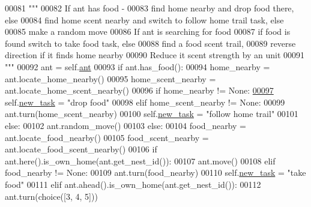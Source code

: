 \begin{DoxyCode}
00081         \textcolor{stringliteral}{"""}
00082 \textcolor{stringliteral}{         If ant has food - }
00083 \textcolor{stringliteral}{             find home nearby and drop food there, else}
00084 \textcolor{stringliteral}{             find home scent nearby and switch to follow home trail task, else}
00085 \textcolor{stringliteral}{             make a random move}
00086 \textcolor{stringliteral}{         If ant is searching for food}
00087 \textcolor{stringliteral}{             if food is found switch to take food task, else}
00088 \textcolor{stringliteral}{             find a food scent trail,}
00089 \textcolor{stringliteral}{             reverse direction if it finds home nearby}
00090 \textcolor{stringliteral}{         Reduce it scent strength by an unit}
00091 \textcolor{stringliteral}{        """}
00092         ant = self.\hyperlink{classtask__manager_1_1Task_ac43e25887825a1bb6e3d4a5a049968be}{ant}
00093         \textcolor{keywordflow}{if} ant.has\_food():
00094             home\_nearby = ant.locate\_home\_nearby()
00095             home\_scent\_nearby = ant.locate\_home\_scent\_nearby()
00096             \textcolor{keywordflow}{if} home\_nearby != \textcolor{keywordtype}{None}:
\hypertarget{task__manager_8py_source_l00097}{}\hyperlink{classtask__manager_1_1Explore_ab1f83ac00c442f8eedd1403a59e74060}{00097}                 self.\hyperlink{classtask__manager_1_1Task_af16658f4c3c447e24f73ed3d1803e058}{new\_task} = \textcolor{stringliteral}{"drop food"}
00098             \textcolor{keywordflow}{elif} home\_scent\_nearby != \textcolor{keywordtype}{None}:
00099                 ant.turn(home\_scent\_nearby)
00100                 self.\hyperlink{classtask__manager_1_1Task_af16658f4c3c447e24f73ed3d1803e058}{new\_task} = \textcolor{stringliteral}{"follow home trail"}
00101             \textcolor{keywordflow}{else}:
00102                 ant.random\_move()
00103         \textcolor{keywordflow}{else}:
00104             food\_nearby = ant.locate\_food\_nearby()
00105             food\_scent\_nearby = ant.locate\_food\_scent\_nearby()
00106             \textcolor{keywordflow}{if} ant.here().is\_own\_home(ant.get\_nest\_id()):
00107                 ant.move()
00108             \textcolor{keywordflow}{elif} food\_nearby != \textcolor{keywordtype}{None}:
00109                 ant.turn(food\_nearby)
00110                 self.\hyperlink{classtask__manager_1_1Task_af16658f4c3c447e24f73ed3d1803e058}{new\_task} = \textcolor{stringliteral}{"take food"}
00111             \textcolor{keywordflow}{elif} ant.ahead().is\_own\_home(ant.get\_nest\_id()):
00112                 ant.turn(choice([3, 4, 5]))

\end{DoxyCode}

